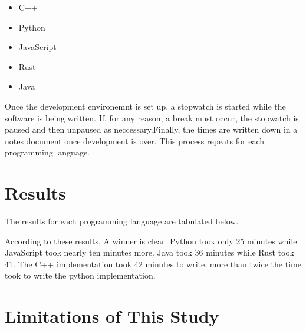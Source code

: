 \documentclass{article}
\begin{document}
\begin{itemize}
        \item C++
        \item Python
        \item JavaScript
        \item Rust
        \item Java
\end{itemize}

Once the development environemnt is set up, a stopwatch is started while the software is being written. If, for any reason, a break must occur, the stopwatch is paused and then unpaused as neccessary.Finally, the times are written down in a notes document once development is over. This process repeats for each programming language. 

\section{Results}

The results for each programming language are tabulated below.
\begin{center}
\begin{adjustbox}{center}
\end{adjustbox}
\end{center}

According to these results, A winner is clear. Python took only 25 minutes while JavaScript took nearly ten minutes more. Java took 36 minutes while Rust took 41. The C++ implementation took 42 minutes to write, more than twice the time took to write the python implementation.

\section{Limitations of This Study}
\end{document}
